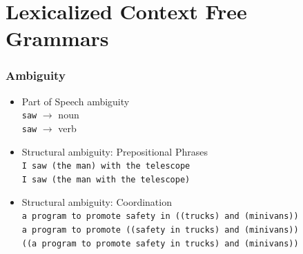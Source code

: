 %

\section{Lexicalized Context Free Grammars}

\begin{frame}
\frametitle{Ambiguity}
\begin{itemize}
  \item Part of Speech ambiguity\\
        {\tt saw} $\rightarrow$ {\color{red}noun}\\
        {\tt saw} $\rightarrow$ {\color{red}verb}
  \item Structural ambiguity: Prepositional Phrases\\
        {\tt I saw (the man) with the telescope}\\
        {\tt I saw (the man with the telescope)}
  \item Structural ambiguity: Coordination\\
        {\tt a program to promote safety in ((trucks) and (minivans))}\\
        {\tt a program to promote ((safety in trucks) and (minivans))}\\
        {\tt ((a program to promote safety in trucks) and (minivans))}
\end{itemize}

\end{frame}

